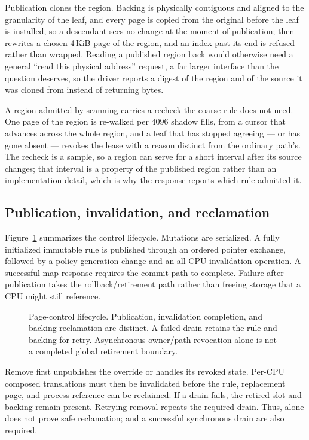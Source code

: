 Publication clones the region. Backing is physically contiguous and aligned to
the granularity of the leaf, and every page is copied from the original before
the leaf is installed, so a descendant sees no change at the moment of
publication;  then rewrites a chosen 4\,KiB page of the region, and
an index past its end is refused rather than wrapped. Reading a published region
back would otherwise need a general ``read this physical address'' request, a
far larger interface than the question deserves, so the driver reports a digest
of the region and of the source it was cloned from instead of returning bytes.

A region admitted by scanning carries a recheck the coarse rule does not need.
One page of the region is re-walked per 4096 shadow fills, from a cursor that
advances across the whole region, and a leaf that has stopped agreeing --- or
has gone absent --- revokes the lease with a reason distinct from the ordinary
path's. The recheck is a sample, so a region can serve for a short interval
after its source changes; that interval is a property of the published region
rather than an implementation detail, which is why the response reports which
rule admitted it.

\subsection{Publication, invalidation, and reclamation}
\label{sec:retire}
Figure~\ref{fig:lease} summarizes the control lifecycle. Mutations are serialized.
A fully initialized immutable rule is published through an ordered pointer
exchange, followed by a policy-generation change and an all-CPU invalidation
operation. A successful map response requires the commit path to complete.
Failure after publication takes the rollback/retirement path rather than
freeing storage that a CPU might still reference.

\begin{figure}[tbp]
\centering

\caption{Page-control lifecycle. Publication, invalidation completion, and
backing reclamation are distinct. A failed drain retains the rule and backing
for retry. Asynchronous owner/path revocation alone is not a completed global
retirement boundary.}
\label{fig:lease}
\end{figure}

Remove first unpublishes the override or handles its revoked state. Per-CPU
composed translations must then be invalidated before the rule, replacement
page, and process reference can be reclaimed. If a drain fails, the retired
slot and backing remain present. Retrying removal repeats the required drain.
Thus,  alone does not prove safe reclamation; 
and a successful synchronous drain are also required.

